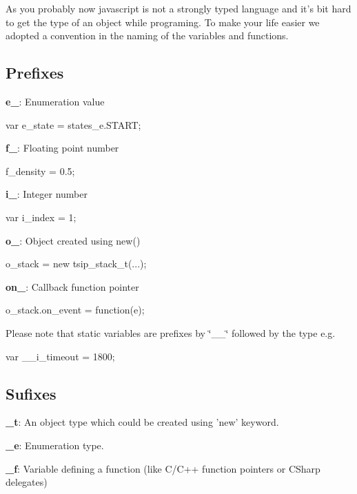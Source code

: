 As you probably now javascript is not a strongly typed language and it's bit hard to get the type of an object while programing. To make your life easier we adopted a convention in the naming of the variables and functions. \subsection*{Prefixes}


\begin{DoxyItemize}
\item {\bfseries e\-\_\-}\-: Enumeration value 
\begin{DoxyCode}
 var e_state = states_e.START; 
\end{DoxyCode}

\item {\bfseries f\-\_\-}\-: Floating point number 
\begin{DoxyCode}
 f_density = 0.5; 
\end{DoxyCode}

\item {\bfseries i\-\_\-}\-: Integer number 
\begin{DoxyCode}
 var i_index = 1; 
\end{DoxyCode}

\item {\bfseries o\-\_\-}\-: Object created using new() 
\begin{DoxyCode}
 o_stack = new tsip_stack_t(...); 
\end{DoxyCode}

\item {\bfseries on\-\_\-}\-: Callback function pointer 
\begin{DoxyCode}
 o_stack.on_event = function(e){}; 
\end{DoxyCode}
 Please note that static variables are prefixes by \char`\"{}\-\_\-\-\_\-\char`\"{} followed by the type e.\-g. 
\begin{DoxyCode}
 var __i_timeout = 1800; 
\end{DoxyCode}
 \subsection*{Sufixes}
\end{DoxyItemize}


\begin{DoxyItemize}
\item {\bfseries \-\_\-t}\-: An object type which could be created using 'new' keyword.
\item {\bfseries \-\_\-e}\-: Enumeration type.
\item {\bfseries \-\_\-f}\-: Variable defining a function (like C/\-C++ function pointers or C\-Sharp delegates) 
\end{DoxyItemize}
